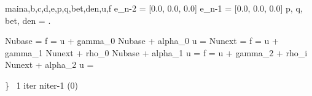 \documentclass[12pt,a4paper]{book}
\begin{document}
\begin{eqcode}{main}{a,b,c,d,e,p,q,bet,den,u,f}
	e_{n-2} = [0.0, 0.0, 0.0] \lend
	e_{n-1} = [0.0, 0.0, 0.0] \lend
	p, q, bet, den =  \lend
	\left.\begin{aligned}
		Nubase =  \lend
		f = u + gamma_0 \cdot Nubase + alpha_0  \cdot {} \lend
		u =  \lend
		Nunext =  \lend
		f = u + gamma_1 \cdot Nunext + rho_0 \cdot Nubase + alpha_1  \cdot {} \lend
		u =  \lend
		f = u + gamma_2 \cdot {} + rho_i \cdot Nunext + alpha_2  \cdot {} \lend
		u =  \lend

		\end{aligned}
	\right\} 
	\  1 \leq iter \leq niter-1 \lend
	  \lend
	\return (0) \lend
\end{eqcode}
\end{document}
